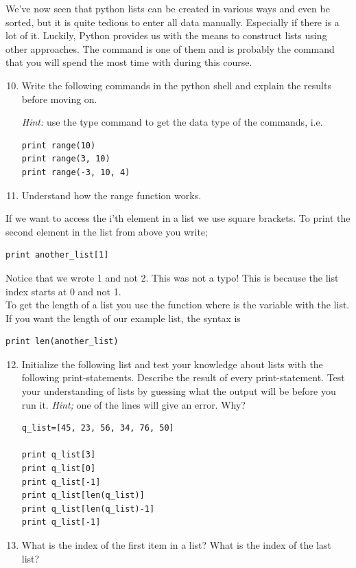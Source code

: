 \documentclass{article}
\begin{document}

We've now seen that python lists can be created in various ways and even be
sorted, but it is quite tedious to enter all data manually. Especially if
there is a lot of it.
Luckily, Python provides us with the means to construct
lists using other approaches.
The  command is one of them and is probably the
command that you will spend the most time with during this course.

\begin{enumerate}
  \setcounter{enumi}{9}
  \item Write the following commands in the python shell and explain the results
    before moving on.

    {\em Hint:} use the type command to get the data type of the commands,
    i.e. 

\begin{lstlisting}
print range(10)
print range(3, 10)
print range(-3, 10, 4)
\end{lstlisting}

  \item Understand how the range function works.
\end{enumerate}


If we want to access the i'th element in a list
we use square brackets. To print the second element
in the list from above you write;

\begin{lstlisting}
print another_list[1]
\end{lstlisting}

Notice that we wrote 1 and not 2. This was not a typo!
This is because the list index starts at 0 and not 1.\\

To get the length of a list you use the function 
where  is the variable with the list.
If you want the length of our example list, the syntax is

\begin{lstlisting}
print len(another_list)
\end{lstlisting}


\begin{enumerate}
  \setcounter{enumi}{11}
  \item Initialize the following list and test your knowledge about
    lists with the following print-statements.
    Describe the result of every print-statement. Test your
    understanding of lists by guessing what the output will be before
    you run it. 
    {\em Hint;} one of the lines will give an error. Why?

\begin{lstlisting}
q_list=[45, 23, 56, 34, 76, 50]

print q_list[3]
print q_list[0]
print q_list[-1]
print q_list[len(q_list)]
print q_list[len(q_list)-1]
print q_list[-1]
\end{lstlisting}

  \item What is the index of the first item in a list? What is the index of
    the last list?

\end{enumerate}
\end{document}
